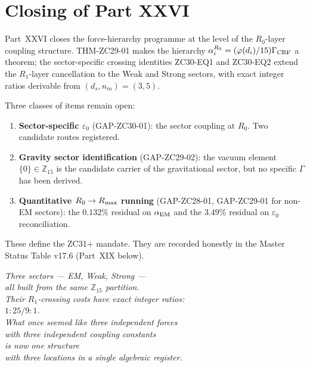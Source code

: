 \documentclass[12pt, a4paper]{article}
\begin{document}

\section*{Closing of Part XXVI}

Part~XXVI closes the force-hierarchy programme at the level of the
$R_0$-layer coupling structure. THM-ZC29-01 makes the hierarchy
$\alpha_i^{R_0} = (\varphi(d_i)/15)\Gamma_{\rm CRF}$ a theorem; the
sector-specific crossing identities ZC30-EQ1 and ZC30-EQ2 extend
the $R_1$-layer cancellation to the Weak and Strong sectors, with
exact integer ratios derivable from $(d_s, n_m) = (3, 5)$.

Three classes of items remain open:
\begin{enumerate}[leftmargin=*, noitemsep]
\item \textbf{Sector-specific $\varepsilon_0$} (GAP-ZC30-01): the
sector coupling at $R_0$. Two candidate routes registered.
\item \textbf{Gravity sector identification} (GAP-ZC29-02): the
vacuum element $\{0\} \in \mathbb{Z}_{15}$ is the candidate carrier
of the gravitational sector, but no specific $\Gamma$ has been
derived.
\item \textbf{Quantitative $R_0 \to R_{\rm max}$ running} (GAP-ZC28-01,
GAP-ZC29-01 for non-EM sectors): the $0.132\%$ residual on $\alpha_{\rm EM}$
and the $3.49\%$ residual on $\varepsilon_0$ reconciliation.
\end{enumerate}

These define the ZC31+ mandate. They are recorded honestly in the
Master Status Table v17.6 (Part~XIX below).

\begin{center}
\textit{Three sectors --- EM, Weak, Strong ---\\
all built from the same $\mathbb{Z}_{15}$ partition.\\
Their $R_1$-crossing costs have exact integer ratios:\\
$1 : 25/9 : 1$.\\[0.3em]
What once seemed like three independent forces\\
with three independent coupling constants\\
is now one structure\\
with three locations in a single algebraic register.}
\end{center}
\end{document}
